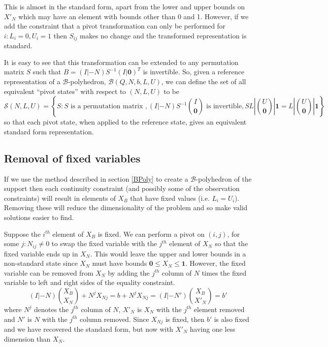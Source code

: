 \documentclass{article}
\begin{document}
This is almost in the standard form, apart from the lower and upper bounds on $X'_N$ which may have an element with bounds other than 0 and 1. However, if we add the constraint that a pivot transformation can only be performed for $i: L_i = 0, U_i=1$ then $S_{ij}$ makes no change and the transformed representation is standard.

It is easy to see that this transformation can be extended to any permutation matrix $S$ such that $B = (I|-N)S^{-1}(I|\mathbf{0})^T$ is invertible. So, given a reference representation of a $\mathcal{B}$-polyhedron, $\mathcal{B}(Q,N,b,L,U)$, we can define the set of all equivalent ``pivot states'' with respect to $(N,L,U)$ to be
\[
\mathcal{S}(N,L,U) = \left\{S : S \text{ is a permutation matrix }, (I|-N)S^{-1}{I\choose \mathbf{0}} \text{ is invertible}, S{L|U \choose \mathbf{0}|\mathbf{1}} = {L|U \choose \mathbf{0}|\mathbf{1}} \right\}
\]
so that each pivot state, when applied to the reference state, gives an equivalent standard form representation.

\subsection{Removal of fixed variables}

If we use the method described in section \eqref{BPoly} to create a $\mathcal{B}$-polyhedron of the support then each continuity constraint (and possibly some of the observation constraints) will result in elements of $X_B$ that have fixed values (i.e. $L_i = U_i$). Removing these will reduce the dimensionality of the problem and so make valid solutions easier to find.

Suppose the $i^{th}$ element of $X_B$ is fixed. We can perform a pivot on $(i,j)$, for some $j:N_{ij}\ne 0$ to swap the fixed variable with the $j^{th}$ element of $X_N$ so that the fixed variable ends up in $X_N$. This would leave the upper and lower bounds in a non-standard state since $X_N$ must have bounds $\mathbf{0} \le X_N \le \mathbf{1}$. However, the fixed variable can be removed from $X_N$ by adding the $j^{th}$ column of $N$ times the fixed variable to left and right sides of the equality constraint.
\[
(I|-N){X_B \choose X_N} + N^jX_{Nj} = b + N^jX_{Nj} = (I|-N'){X_B \choose X'_N} = b'
\]
where $N^j$ denotes the $j^{th}$ column of $N$, $X'_N$ is $X_N$ with the $j^{th}$ element removed and $N'$ is $N$ with the $j^{th}$ column removed. Since $X_{Nj}$ is fixed, then $b'$ is also fixed and we have recovered the standard form, but now with $X'_N$ having one less dimension than $X_N$.
\end{document}
